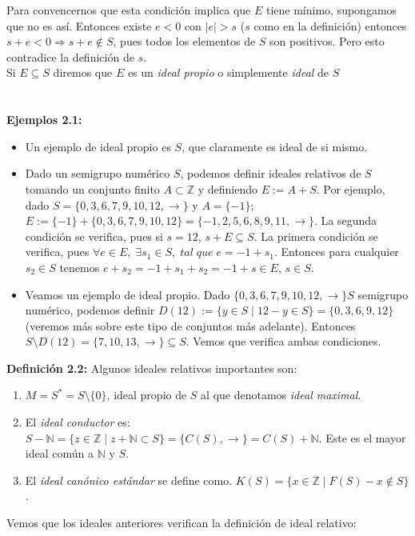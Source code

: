 \documentclass[11pt,spanish]{book}
\begin{document}
Para convencernos que esta condición implica que $E$ tiene mínimo, supongamos que no es así. Entonces existe $e<0$ con $|e|> s$ ($s$ como en la definición) entonces $s+e<0\Rightarrow s+e\notin S$, pues todos los elementos de $S$ son positivos. Pero esto contradice la definición de $s$.\\
Si $E\subseteq S$ diremos que $E$ es un \textit{ideal propio} o simplemente \textit{ideal} de $S$ \\
\\
\\ \textbf{Ejemplos 2.1:}
\begin{itemize}
    \item Un ejemplo de ideal propio es $S$, que claramente es ideal de si mismo. \\
    \item Dado un semigrupo numérico $S$, podemos definir ideales relativos de $S$ tomando un conjunto finito $A\subset \mathbb{Z}$ y definiendo $E:=A+S$. Por ejemplo, dado $S=\{0,3,6,7,9,10,12,\rightarrow\}$ y $A=\{-1\}$; $E:=\{-1\}+\{0,3,6,7,9,10,12\}=\{-1,2,5,6,8,9,11,\rightarrow\}$. La segunda condición se verifica, pues si $s=12$, $s+E\subseteq S$. La primera condición se verifica, pues $\forall e\in E,\;\exists s_{1}\in S,\; tal\; que\; e = -1+s_{1}$. Entonces para cualquier $s_{2}\in S$ tenemos $e+s_{2}=-1+s_{1}+s_{2}=-1+s\in E$, $s\in S$.
    \item Veamos un ejemplo de ideal propio. Dado $\{0,3,6,7,9,10,12,\rightarrow\}S$ semigrupo numérico, podemos definir $D(12):=\{y\in S\;|\; 12-y\in S\}=\{0,3,6, 9, 12\}$ (veremos más sobre este tipo de conjuntos más adelante). Entonces $S\setminus D(12) = \{7,10,13,\rightarrow\}\subseteq S$. Vemos que verifica ambas condiciones. 
\end{itemize}
\textbf{Definición 2.2:} Algunos ideales relativos importantes son:
\begin{enumerate}
    \item $M = S^{*}=S\setminus\{0\}$, ideal propio de $S$ al que denotamos \textit{ideal maximal}. 
    \item El \textit{ideal conductor} es: $S-\mathbb{N} = \{z\in\mathbb{Z}\; |\; z+\mathbb{N}\subset S\} =\{C(S),\rightarrow\} = C(S)+\mathbb{N}$. Este es el mayor ideal común a $\mathbb{N}$ y $S$. 
    \item El \textit{ideal canónico estándar} se define como. $K(S) = \{x\in\mathbb{Z}\;|\;F(S)-x\notin S\}$. 
\end{enumerate}
Vemos que los ideales anteriores verifican la definición de ideal relativo:
\end{document}
